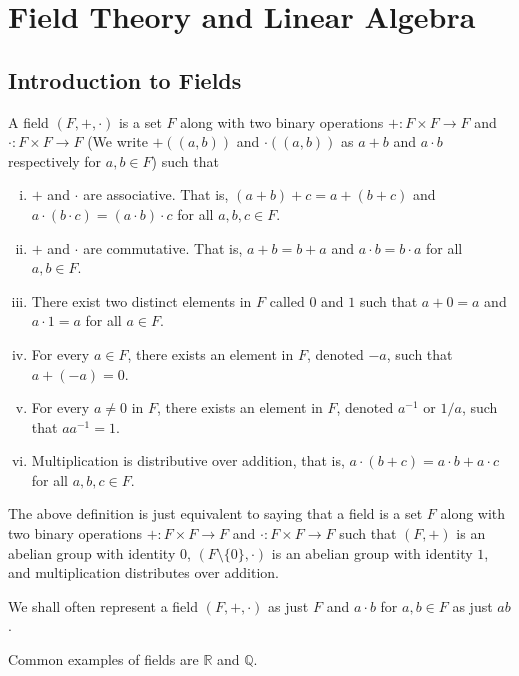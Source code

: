 \section{Field Theory and Linear Algebra}

\subsection{Introduction to Fields}

\begin{definition}
    A field $(F,+,\cdot)$ is a set $F$ along with two binary operations $+:F\times F\to F$ and $\cdot:F\times F\to F$ (We write $+((a,b))$ and $\cdot((a,b))$ as $a+b$ and $a\cdot b$ respectively for $a,b\in F$) such that
    \begin{enumerate}[(i)]
        \item $+$ and $\cdot$ are associative. That is, $(a+b)+c=a+(b+c)$ and $a\cdot(b\cdot c)=(a\cdot b)\cdot c$ for all $a,b,c\in F$.
        \item $+$ and $\cdot$ are commutative. That is, $a+b=b+a$ and $a\cdot b=b\cdot a$ for all $a,b\in F$.
        \item There exist two distinct elements in $F$ called $0$ and $1$ such that $a+0=a$ and $a\cdot 1=a$ for all $a\in F$.
        \item For every $a\in F$, there exists an element in $F$, denoted $-a$, such that $a+(-a)=0$.
        \item For every $a\neq 0$ in $F$, there exists an element in $F$, denoted $a^{-1}$ or $1/a$, such that $aa^{-1}=1$.
        \item Multiplication is distributive over addition, that is, $a\cdot(b+c)=a\cdot b+a\cdot c$ for all $a,b,c\in F$.
    \end{enumerate}
\end{definition}

The above definition is just equivalent to saying that a field is a set $F$ along with two binary operations $+:F\times F\to F$ and $\cdot:F\times F\to F$ such that $(F,+)$ is an abelian group with identity $0$, $(F\setminus\{0\},\cdot)$ is an abelian group with identity $1$, and multiplication distributes over addition.

\vspace{2mm}
We shall often represent a field $(F,+,\cdot)$ as just $F$ and $a\cdot b$ for $a,b\in F$ as just $ab$.

Common examples of fields are $\mathbb{R}$ and $\mathbb{Q}$.

